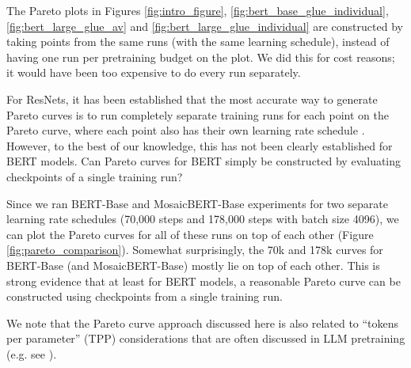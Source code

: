 The Pareto plots in Figures \ref{fig:intro_figure}, \ref{fig:bert_base_glue_individual}, \ref{fig:bert_large_glue_av} and \ref{fig:bert_large_glue_individual} are constructed by taking points from the same runs (with the same learning schedule), instead of having one run per pretraining budget on the plot. We did this for cost reasons; it would have been too expensive to do every run separately. 

For ResNets, it has been established that the most accurate way to generate Pareto curves is to run completely separate training runs for each point on the Pareto curve, where each point also has their own learning rate schedule \citep{portes2022fast}. However, to the best of our knowledge, this has not been clearly established for BERT models. Can Pareto curves for BERT simply be constructed by evaluating checkpoints of a single training run?

Since we ran BERT-Base and MosaicBERT-Base experiments for two separate learning rate schedules (70,000 steps and 178,000 steps with batch size 4096), we can plot the Pareto curves for all of these runs on top of each other (Figure \ref{fig:pareto_comparison}). Somewhat surprisingly, the 70k and 178k curves for BERT-Base (and MosaicBERT-Base) mostly lie on top of each other. This is strong evidence that at least for BERT models, a reasonable Pareto curve can be constructed using checkpoints from a single training run.

We note that the Pareto curve approach discussed here is also related to ``tokens per parameter'' (TPP) considerations that are often discussed in LLM pretraining (e.g. see \citep{dey2023btlm}).






